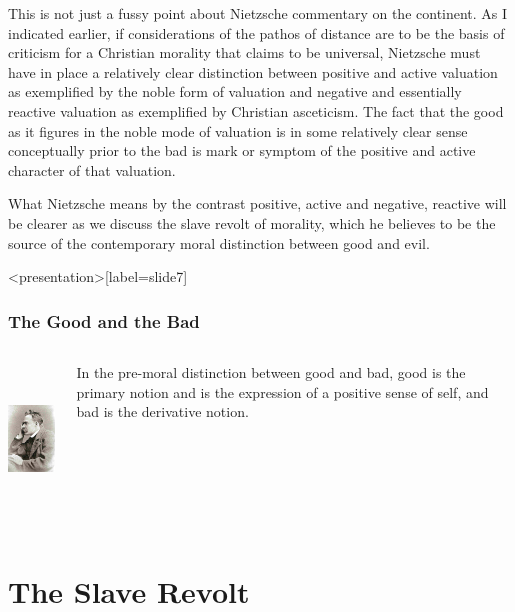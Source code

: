 This is not just a fussy point about Nietzsche commentary on the continent. As I indicated earlier, if considerations of the pathos of distance are to be the basis of criticism for a Christian morality that claims to be universal, Nietzsche must have in place a relatively clear distinction between positive and active valuation as exemplified by the noble form of valuation and negative and essentially reactive valuation as exemplified by Christian asceticism. The fact that the good as it figures in the noble mode of valuation is in some relatively clear sense conceptually prior to the bad is mark or symptom of the positive and active character of that valuation.

What Nietzsche means by the contrast positive, active and negative, reactive will be clearer as we discuss the slave revolt of morality, which he believes to be the source of the contemporary moral distinction between good and evil. \change

\begin{frame}<presentation>[label=slide7]
    \frametitle{The Good and the Bad}
        \begin{columns}
            \begin{column}{3cm}
                \includegraphics[height=4cm]{../../graphics/nietzsche.jpg}
            \end{column}
            \begin{column}{7cm}
                In the pre-moral distinction between good and bad, \alert{good} is the primary notion and is the expression of a positive sense of self, and \alert{bad} is the derivative notion.
            \end{column}
        \end{columns}
\end{frame}


\section{The Slave Revolt}\label{sec:the_slave_revolt} %

